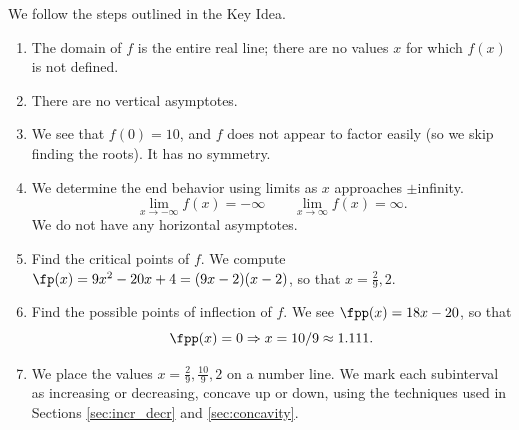 {We follow the steps outlined in the Key Idea.
\begin{enumerate}
	\item	The domain of $f$ is the entire real line; there are no values $x$ for which $f(x)$ is not defined.
	\item	There are no vertical asymptotes.
	\item	We see that $f(0)=10$, and $f$ does not appear to factor easily (so we skip finding the roots).  It has no symmetry.
	\item	We determine the end behavior using limits as $x$ approaches $\pm$infinity.			\[\lim_{x\to-\infty}f(x)=-\infty\qquad\lim_{x\to\infty}f(x)=\infty.\]
		We do not have any horizontal asymptotes.
	\item	Find the critical points of $f$. We compute $\fp(x) = 9x^2-20x+4=(9x-2)(x-2)$, so that $x=\frac29,2$.
	\item	Find the possible points of inflection of $f$. We see $\fpp(x) = 18x-20$, so that
	\[\fpp(x) = 0 \Rightarrow x= 10/9 \approx 1.111.\]
	\item	We place the values $x=\frac29,\frac{10}9,2$ on a number line. We mark each subinterval as increasing or decreasing, concave up or down, using the techniques used in Sections \ref{sec:incr_decr} and \ref{sec:concavity}.


\end{enumerate}}
